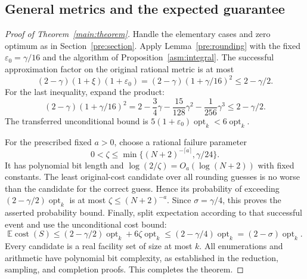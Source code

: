 \subsection{General metrics and the expected guarantee}

\begin{proof}[Proof of Theorem~\ref{main:theorem}]
Handle the elementary cases and zero optimum as in
Section~\ref{pre:section}. Apply Lemma~\ref{pre:rounding} with
the fixed $\varepsilon_0=\gamma/16$ and the algorithm of
Proposition~\ref{asm:integral}. The successful approximation factor
on the original rational metric is at most
\[
 (2-\gamma)(1+\xi)(1+\varepsilon_0)
  =(2-\gamma)(1+\gamma/16)^2
  \le2-\gamma/2.
\]
For the last inequality, expand the product:
\[
 (2-\gamma)(1+\gamma/16)^2
 =2-\frac34\gamma-\frac{15}{128}\gamma^2
                  -\frac1{256}\gamma^3
 \le2-\gamma/2.
\]
The transferred unconditional bound is
$5(1+\varepsilon_0)\operatorname{opt}_k<6\operatorname{opt}_k$.

For the prescribed fixed $a>0$, choose a rational failure parameter
\[
 0<\zeta\le\min\{(N+2)^{-\lceil a\rceil},\gamma/24\}.
\]
It has polynomial bit length and
$\log(2/\zeta)=O_a(\log(N+2))$ with fixed constants.
The least original-cost candidate over all rounding guesses is
no worse than the candidate for the correct guess. Hence its
probability of exceeding $(2-\gamma/2)\operatorname{opt}_k$
is at most $\zeta\le(N+2)^{-a}$.
Since $\sigma=\gamma/4$, this proves the asserted probability bound.
Finally, split expectation according to that successful event and
use the unconditional cost bound:
\[
 \mathbb E\operatorname{cost}(S)
 \le (2-\gamma/2)\operatorname{opt}_k
              +6\zeta\operatorname{opt}_k
 \le(2-\gamma/4)\operatorname{opt}_k
 =(2-\sigma)\operatorname{opt}_k.
\]
Every candidate is a real facility set of size at most $k$.
All enumerations and arithmetic have polynomial bit complexity,
as established in the reduction, sampling, and completion proofs.
This completes the theorem.
\end{proof}
